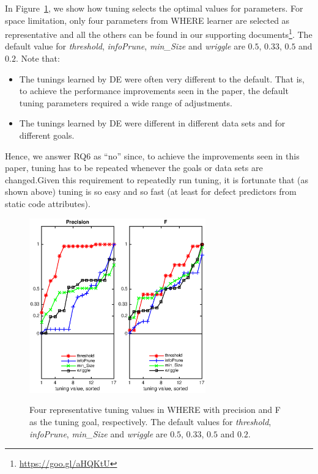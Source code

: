 \documentclass{sig-alternative}
\newcommand{\bi}{\begin{itemize}[leftmargin=0.4cm]}
\newcommand{\ei}{\end{itemize}}
\newcommand{\fig}[1]{Figure~\ref{fig:#1}}
\begin{document}
 In \fig{features}, we show how tuning selects the optimal values for parameters. For space limitation, only four parameters from WHERE learner are selected as representative and all the others can be found in our supporting documents\footnote{\url{https://goo.gl/aHQKtU}}.
The default value for {\em threshold}, {\em infoPrune}, {\em min\_Size} and {\em wriggle} are $0.5$, $0.33$, $0.5$ and $0.2$. Note that:
\bi
\item
The tunings learned by DE
were often very different to the default. That is, to achieve the performance improvements seen in the paper,
the default tuning parameters required a wide range of adjustments.
\item The tunings learned by DE were different in different data sets and for different goals.
\ei
Hence, we answer RQ6 as ``no'' since, to achieve the improvements seen in this paper, tuning has to be repeated whenever the goals or data
sets are changed.Given this requirement to repeatedly run tuning, it is fortunate that (as shown above)
tuning is so easy and so fast (at least for defect predictors from static code attributes).

\begin{figure}[!t]
\begin{center}
\includegraphics[width=1.5in]{features_precision.eps}\includegraphics[width=1.5in]{features_F.eps}
 \end{center}
\caption{Four representative tuning values in WHERE with  precision and F as the tuning goal, respectively. The default values for {\em threshold}, {\em infoPrune}, {\em min\_Size} and {\em wriggle} are $0.5$, $0.33$, $0.5$ and $0.2$.  }\label{fig:features}
 \end{figure}
\end{document}
